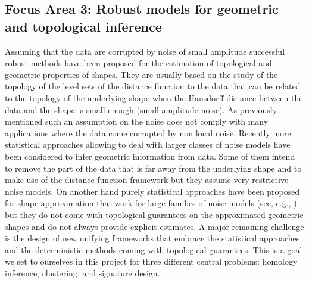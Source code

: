 \subsection*{Focus Area 3:  Robust models for geometric and topological inference}%


%
%



Assuming that the data are corrupted by noise of small amplitude successful robust methods have been proposed for the estimation of topological and geometric  properties of shapes. They are usually based on the study of the topology of the level sets of the distance function to the data that can be related to the topology of the underlying shape when the Hausdorff distance  between the data and the shape is small enough (small amplitude noise). As previously mentioned such an assumption on the noise does not comply with many applications where the data come corrupted by non local noise. 
Recently more statistical approaches allowing to deal with larger classes of noise models have been considered to infer geometric information from data. Some of them intend to remove the part of the data that is far away from the underlying shape and to make use of  the distance function framework \cite{nsw-tvu-2011} but they assume very restrictive noise models. On another hand purely statistical approaches have been proposed for shape approximation that work for large families of noise models (see, e.g., \cite{gpvw-mme-2011,gpvw-mesd-2011}) but they do not come with topological guarantees on the approximated geometric shapes and do not always provide explicit estimates. A major remaining challenge is the design of new unifying frameworks that embrace the statistical approaches and the deterministic methods coming with topological guarantees.  
This is a goal we set to ourselves in this project for three different central problems: homology inference, clustering, and signature design.



